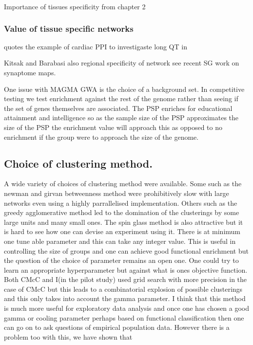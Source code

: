 Importance of tissues specificity from chapter 2 \subsubsection{Value of tissue specific networks}
\label{sec:value_of_tissue_specific_networks}

\cite{parikshak2015systems} quotes the example of cardiac PPI to investigaste long QT in \cite{lundby2014annotation}

Kitsak and Barabasi \cite{kitsak2016tissue}
also regional specificity of network see recent SG work on synaptome maps. 

One issue with MAGMA GWA is the choice of a background set. In competitive testing we test enrichment against the rest of the genome rather than seeing if the set of genes themselves are associated. The PSP enriches for educational attainment and intelligence so as the sample size of the PSP approximates the size of the PSP the enrichment value will approach this as opposed to no enrichment if the group were to approach the size of the genome. 


\subsection{Choice of clustering method.} 

A wide variety of choices of clustering method were available. Some such as the newman and girvan betweenness method were prohibitively slow with large networks even using a highly parrallelised implementation. Others such as the greedy agglomerative method led to the domination of the clusterings by some large units and many small ones. The spin glass method is also attractive but it is hard to see how one can devise an experiment using it. There is at minimum one tune able parameter and this can take any integer value. This is useful in controlling the size of groups and one can achieve good functional enrichment but the question of the choice of parameter remains an open one. One could try to learn an appropriate hyperparameter but against what is ones objective function. Both CMcC and I(in the pilot study) used grid search with more precision in the case of CMcC but this leads to a combinatorial explosion of possible clusterings and this only takes into account the gamma parameter. I think that this method is much more useful for exploratory data analysis and once one has chosen a good gamma or cooling parameter perhaps based on functional classification then one can go on to ask questions of empirical population data. However there is a problem too with this, we have shown that


